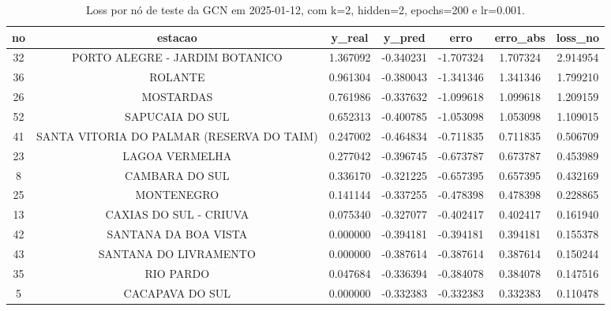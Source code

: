 \begin{table}[h]
\centering
\caption{Loss por nó de teste da GCN em 2025-01-12, com k=2, hidden=2, epochs=200 e lr=0.001.}
\label{tab:gcn_loss_nodes_k2_hidden2}
\begin{tabular}{ccccccc}
\toprule
no & estacao & y\_real & y\_pred & erro & erro\_abs & loss\_no \\
\midrule
32 & PORTO ALEGRE - JARDIM BOTANICO & 1.367092 & -0.340231 & -1.707324 & 1.707324 & 2.914954 \\
36 & ROLANTE & 0.961304 & -0.380043 & -1.341346 & 1.341346 & 1.799210 \\
26 & MOSTARDAS & 0.761986 & -0.337632 & -1.099618 & 1.099618 & 1.209159 \\
52 & SAPUCAIA DO SUL & 0.652313 & -0.400785 & -1.053098 & 1.053098 & 1.109015 \\
41 & SANTA VITORIA DO PALMAR (RESERVA DO TAIM) & 0.247002 & -0.464834 & -0.711835 & 0.711835 & 0.506709 \\
23 & LAGOA VERMELHA & 0.277042 & -0.396745 & -0.673787 & 0.673787 & 0.453989 \\
8 & CAMBARA DO SUL & 0.336170 & -0.321225 & -0.657395 & 0.657395 & 0.432169 \\
25 & MONTENEGRO & 0.141144 & -0.337255 & -0.478398 & 0.478398 & 0.228865 \\
13 & CAXIAS DO SUL - CRIUVA & 0.075340 & -0.327077 & -0.402417 & 0.402417 & 0.161940 \\
42 & SANTANA DA BOA VISTA & 0.000000 & -0.394181 & -0.394181 & 0.394181 & 0.155378 \\
43 & SANTANA DO LIVRAMENTO & 0.000000 & -0.387614 & -0.387614 & 0.387614 & 0.150244 \\
35 & RIO PARDO & 0.047684 & -0.336394 & -0.384078 & 0.384078 & 0.147516 \\
5 & CACAPAVA DO SUL & 0.000000 & -0.332383 & -0.332383 & 0.332383 & 0.110478 \\
\bottomrule
\end{tabular}
\end{table}
